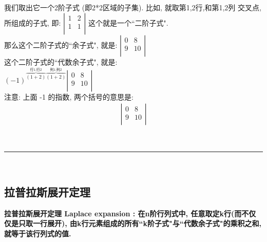 \documentclass[UTF8]{ctexart}
\begin{document}
我们取出它一个2阶子式 (即2*2区域的子集). 比如, 就取第1,2行,和第1,2列 交叉点, 所组成的子式, 即:
$
\left| \begin{matrix}
	1&		2\\
	1&		1\\
\end{matrix} \right|
$
	这个就是一个``二阶子式". \\
	
	那么这个二阶子式的``余子式", 就是:
$
\left| \begin{matrix}
	0&		8\\
	9&		10\\
\end{matrix} \right|
$	\\




这个二阶子式的``代数余子式", 就是: \\
$
\left( -1 \right) ^{\overset{\text{行1,行}2}{\overbrace{\left( 1+2 \right) }}\overset{\text{列1,列}2}{\overbrace{\left( 1+2 \right) }}}\left| \begin{matrix}
	0&		8\\
	9&		10\\
\end{matrix} \right|
$ \\

	注意: 上面 -1 的指数, 两个括号的意思是:
	\begin{align*}
		\left| \begin{matrix}
			0&		8\\
			9&		10\\
		\end{matrix} \right|
	\end{align*}
	

	~\\
	\hrule
	~\\

	\subsection{拉普拉斯展开定理}
	
	\textbf{拉普拉斯展开定理 Laplace expansion : 在n阶行列式中, 任意取定k行(而不仅仅是只取一行展开), 由k行元素组成的所有``k阶子式"与``代数余子式"的乘积之和, 就等于该行列式的值.} \\
	
\end{document}
